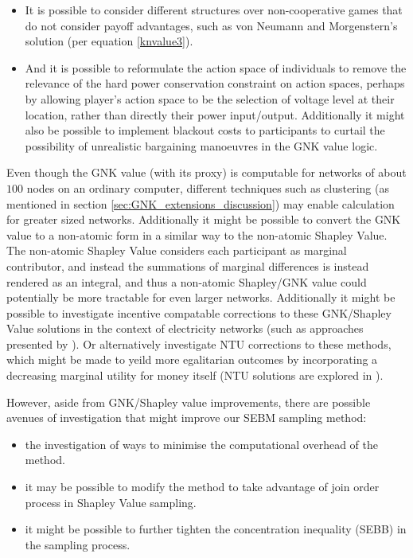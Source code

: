 \begin{itemize}
\item	It is possible to consider different structures over non-cooperative games that do not consider payoff advantages, such as von Neumann and Morgenstern's solution (per equation \ref{knvalue3}).
\item	And it is possible to reformulate the action space of individuals to remove the relevance of the hard power conservation constraint on action spaces, perhaps by allowing player's action space to be the selection of voltage level at their location, rather than directly their power input/output. Additionally it might also be possible to implement blackout costs to participants to curtail the possibility of unrealistic bargaining manoeuvres in the GNK value logic.
\end{itemize}


Even though the GNK value (with its proxy) is computable for networks of about $100$ nodes on an ordinary computer, different techniques such as clustering (as mentioned in section \ref{sec:GNK_extensions_discussion}) may enable calculation for greater sized networks.
Additionally it might be possible to convert the GNK value to a non-atomic form in a similar way to the non-atomic Shapley Value.
The non-atomic Shapley Value considers each participant as marginal contributor, and instead the summations of marginal differences is instead rendered as an integral, and thus a non-atomic Shapley/GNK value could potentially be more tractable for even larger networks.
Additionally it might be possible to investigate incentive compatable corrections to these GNK/Shapley Value solutions in the context of electricity networks (such as approaches presented by \cite{myerson1,Salamanca2019}).
Or alternatively investigate NTU corrections to these methods, which might be made to yeild more egalitarian outcomes by incorporating a decreasing marginal utility for money itself (NTU solutions are explored in \cite{value1}).

However, aside from GNK/Shapley value improvements, there are possible avenues of investigation that might improve our SEBM sampling method:
\begin{itemize}
\item	the investigation of ways to minimise the computational overhead of the method.
\item	it may be possible to modify the method to take advantage of join order process in Shapley Value sampling.
\item	it might be possible to further tighten the concentration inequality (SEBB) in the sampling process.
\end{itemize}

